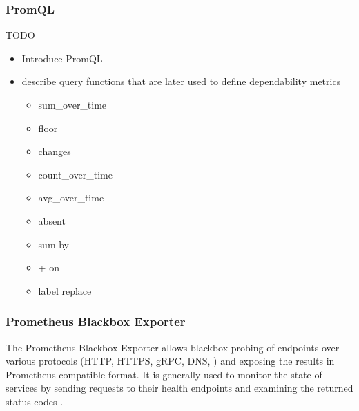 \subsubsection{PromQL} \label{background-promql}

TODO

\begin{itemize}
	\item Introduce PromQL \cite{PrometheusQueryingBasics}
	\item describe query functions that are later used to define dependability metrics \cite{PrometheusQueryingFunctions} \cite{PrometheusQueryingOperators}
	\begin{itemize}
		\item sum\_over\_time
		\item floor
		\item changes
		\item count\_over\_time
		\item avg\_over\_time
		\item absent
		\item sum by
		\item + on
		\item label replace
	\end{itemize}
\end{itemize}

\subsubsection{Prometheus Blackbox Exporter}

The Prometheus Blackbox Exporter allows blackbox probing of endpoints over various protocols (HTTP, HTTPS, gRPC, DNS, \etc) and exposing the results in Prometheus compatible format. It is generally used to monitor the state of services by sending requests to their health endpoints and examining the returned status codes \cite{PrometheusBlackboxExporter}. 



